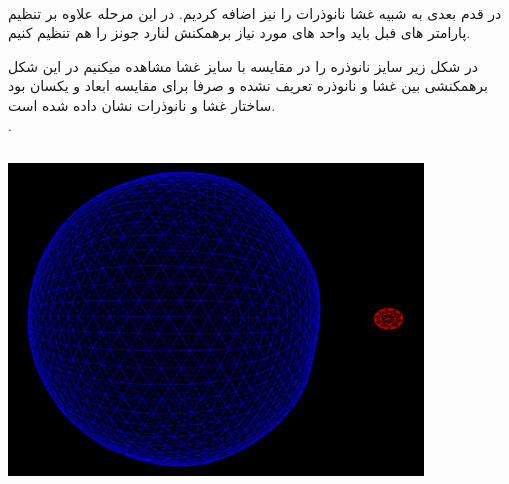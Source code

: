 \documentclass[12pt,onecolumn,a4paper]{report}
\begin{document}
\\
در قدم بعدی به شبیه غشا نانوذرات را نیز اضافه کردیم. در این مرحله علاوه بر تنظیم پارامتر های فبل باید واحد های مورد نیاز برهمکنش لنارد جونز را هم تنظیم کنیم.

در شکل زیر سایز نانوذره را در مقایسه با سایز غشا مشاهده میکنیم
در این شکل برهمکنشی بین غشا و نانوذره تعریف نشده و صرفا برای مقایسه ابعاد و یکسان بود ساختار غشا و نانوذرات نشان داده شده است.
\\.
\begin{center}
\includegraphics[width=11cm, height=9cm]{20210209_195305.png}
\end{center}\\
\end{document}
